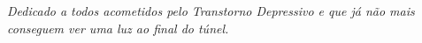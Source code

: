 \thispagestyle{empty}

\vspace*{200mm}
\begin{flushright}
	\textit{Dedicado a todos acometidos pelo Transtorno Depressivo e que já não mais conseguem ver uma luz ao final do túnel.}
\end{flushright}

